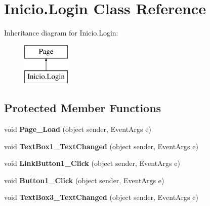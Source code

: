 \hypertarget{class_inicio_1_1_login}{}\section{Inicio.\+Login Class Reference}
\label{class_inicio_1_1_login}
Inheritance diagram for Inicio.\+Login\+:\begin{figure}[H]
\begin{center}
\leavevmode
\includegraphics[height=2.000000cm]{class_inicio_1_1_login}
\end{center}
\end{figure}
\subsection*{Protected Member Functions}
\begin{DoxyCompactItemize}
\item 
\mbox{\label{class_inicio_1_1_login_a82c40c536f8833e113c9149c09b1f4de}} 
void {\bfseries Page\+\_\+\+Load} (object sender, Event\+Args e)
\item 
\mbox{\label{class_inicio_1_1_login_ac97e06c22c6f6ac020c4cf2eff5e48ea}} 
void {\bfseries Text\+Box1\+\_\+\+Text\+Changed} (object sender, Event\+Args e)
\item 
\mbox{\label{class_inicio_1_1_login_a4d29cabcb378199a88f9ec9dc57961da}} 
void {\bfseries Link\+Button1\+\_\+\+Click} (object sender, Event\+Args e)
\item 
\mbox{\label{class_inicio_1_1_login_a4c72ae6605baac8dff22e547df892ba1}} 
void {\bfseries Button1\+\_\+\+Click} (object sender, Event\+Args e)
\item 
\mbox{\label{class_inicio_1_1_login_a332bc2333d4b1baf24c09b02f343734b}} 
void {\bfseries Text\+Box3\+\_\+\+Text\+Changed} (object sender, Event\+Args e)
\end{DoxyCompactItemize}
